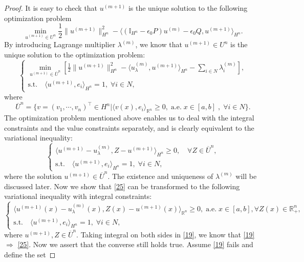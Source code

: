 \documentclass[10pt]{article}
\begin{document}
\begin{proof}
It is easy to check that $u^{(m+1)}$ is the unique solution to the following   optimization problem
\begin{equation}\label{27}
 \min_{u^{(m+1)}\in U^n} \frac{1}{2}\|u^{(m+1)}\|^2_{H^n}-\langle (\mathbb{I}_{H^n}-\epsilon_0P){u^{(m)}}-\epsilon_0Q,u^{(m+1)}\rangle_{H^n}.
\end{equation}
By introducing   Lagrange multiplier $\lambda^{(m)}$, we know that $u^{(m+1)}\in U^n$  is  the unique solution to the   optimization problem:
  \begin{equation*}
   \begin{cases}
\min_{u^{(m+1)}\in \overline{U}^n}[ \frac{1}{2}\|u^{(m+1)}\|^2_{H^n}-\langle u^{(m)}_{\lambda},u^{(m+1)}\rangle_{H^n}-\sum_{i\in N}\lambda^{(m)}_i],\\
\mbox{s.t.}\quad \langle u^{(m+1)},e_i\rangle_{H^n}=1,\;\forall i\in N,
\end{cases}
 \end{equation*}
where $$\overline{U}^n=\{v=(v_1,\cdots,v_n)^{\top}\in H^n|\langle v(x),e_i\rangle_{\mathbb{R}^n}\geq0,\;\mbox{a.e.}\;x\in[a,b]\;,\;\forall i\in N\}.$$ 
The optimization problem mentioned above enables us to deal with the integral constraints and the value constraints separately, and is clearly equivalent to the    variational inequality:
 \begin{equation}\label{25}
   \begin{cases}
\langle u^{(m+1)}-u^{(m)}_{\lambda},Z-u^{(m+1)}\rangle_{H^n}\geq0,\quad\forall Z\in \overline{U}^n,\\
\mbox{s.t.}\quad \langle u^{(m+1)},e_i\rangle_{H^n}=1,\;\forall i\in N,
   \end{cases}
 \end{equation}
where the solution $u^{(m+1)}\in \overline{U}^n$. The existence and uniqueness of $\lambda^{(m)}$ will be discussed later. Now we show  that \eqref{25} can be transformed to the following  variational inequality with integral constraints:
  \begin{equation}\label{19}
   \begin{cases}
\langle u^{(m+1)}(x)-u^{(m)}_{\lambda}(x),Z(x)-u^{(m+1)}(x)\rangle_{\mathbb{R}^n}\geq0,\;\mbox{a.e.}\;x\in[a,b],\forall Z(x)\in \mathbb{R}^n_+,\;\\
\mbox{s.t.}\quad \langle u^{(m+1)},e_i\rangle_{H^n}=1,\;\forall i\in N,
   \end{cases}
 \end{equation}
where $u^{(m+1)},Z\in  \overline{U}^n$. Taking integral on both sides in \eqref{19}, we know that \eqref{19}$\Rightarrow$ \eqref{25}. Now we assert that the converse still holds true. Assume \eqref{19} fails and define the set

\end{proof}
\end{document}
